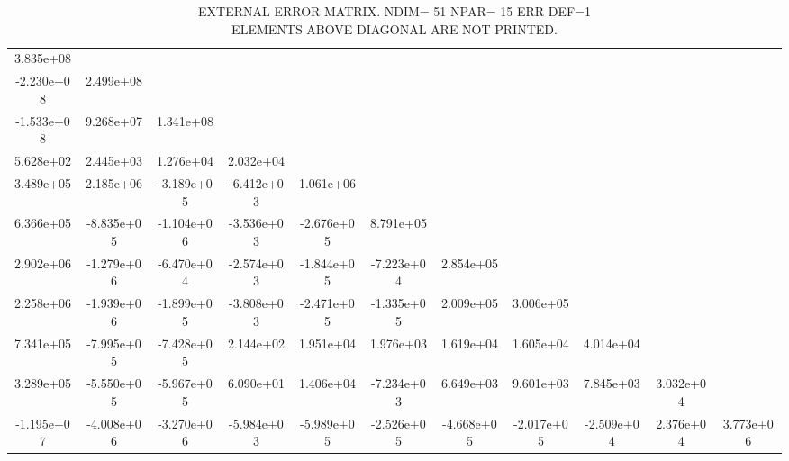  
 \begin{sidewaystable}[!ht]
 \scriptsize
 \centering
 \begin{tabular}{c c c c c c c c c c c}
  3.835e+08 & \\
 -2.230e+08 &  2.499e+08 & \\
 -1.533e+08 &  9.268e+07 &  1.341e+08 & \\
  5.628e+02 &  2.445e+03 &  1.276e+04 &  2.032e+04 & \\
  3.489e+05 &  2.185e+06 & -3.189e+05 & -6.412e+03 &  1.061e+06 & \\
  6.366e+05 & -8.835e+05 & -1.104e+06 & -3.536e+03 & -2.676e+05 &  8.791e+05 & \\
  2.902e+06 & -1.279e+06 & -6.470e+04 & -2.574e+03 & -1.844e+05 & -7.223e+04 &  2.854e+05 & \\
  2.258e+06 & -1.939e+06 & -1.899e+05 & -3.808e+03 & -2.471e+05 & -1.335e+05 &  2.009e+05 &  3.006e+05 & \\
  7.341e+05 & -7.995e+05 & -7.428e+05 &  2.144e+02 &  1.951e+04 &  1.976e+03 &  1.619e+04 &  1.605e+04 &  4.014e+04 & \\
  3.289e+05 & -5.550e+05 & -5.967e+05 &  6.090e+01 &  1.406e+04 & -7.234e+03 &  6.649e+03 &  9.601e+03 &  7.845e+03 &  3.032e+04 & \\
 -1.195e+07 & -4.008e+06 & -3.270e+06 & -5.984e+03 & -5.989e+05 & -2.526e+05 & -4.668e+05 & -2.017e+05 & -2.509e+04 &  2.376e+04 &  3.773e+06 \\ 
 
 \end{tabular}
 \caption{EXTERNAL ERROR MATRIX.    NDIM=  51    NPAR= 15    ERR DEF=1\\ ELEMENTS ABOVE DIAGONAL ARE NOT PRINTED.}
 \end{sidewaystable}

